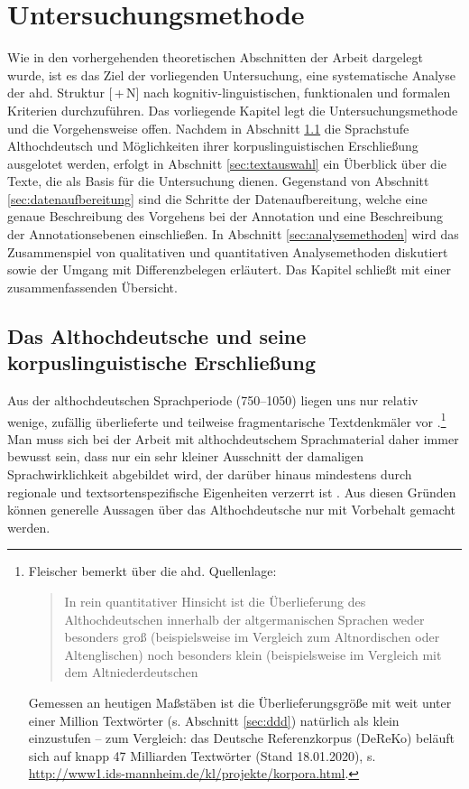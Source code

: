 \chapter{Untersuchungsmethode}\label{methode}

Wie in den vorhergehenden theoretischen Abschnitten der Arbeit dargelegt wurde, ist es das Ziel der vorliegenden Untersuchung, eine systematische Analyse der ahd. Struktur [\,+\,N] nach  kognitiv-linguistischen, funktionalen und formalen Kriterien durchzuführen. Das vorliegende Kapitel legt die Untersuchungsmethode und die Vorgehensweise offen. Nachdem in Abschnitt \ref{sec:ahd} die Sprachstufe Althochdeutsch und Möglichkeiten ihrer korpuslinguistischen Erschließung ausgelotet werden, erfolgt in Abschnitt \ref{sec:textauswahl} ein Überblick über die Texte, die als Basis für die Untersuchung dienen. Gegenstand von Abschnitt \ref{sec:datenaufbereitung} sind die Schritte der Datenaufbereitung, welche eine genaue Beschreibung des Vorgehens bei der Annotation und eine Beschreibung der Annotationsebenen einschließen. In Abschnitt \ref{sec:analysemethoden} wird das Zusammenspiel von qualitativen und quantitativen Analysemethoden diskutiert sowie der Umgang mit Differenzbelegen erläutert. Das Kapitel schließt mit einer zusammenfassenden Übersicht. 

\section{Das Althochdeutsche und seine korpuslinguistische Erschließung}\label{sec:ahd}

Aus der althochdeutschen Sprachperiode (750--1050) liegen uns nur relativ wenige, zufällig überlieferte und teilweise fragmentarische Textdenkmäler vor \parencite[zur Überlieferungsproblematik s. ausführlich][49--105]{Sonderegger2003}.\footnote{Fleischer bemerkt über die ahd. Quellenlage: \blockcquote[27]{Fleischer2006}{In rein quantitativer Hinsicht ist die Überlieferung des Althochdeutschen innerhalb der altgermanischen Sprachen weder besonders groß (beispielsweise im Vergleich zum Altnordischen oder Altenglischen) noch besonders  klein (beispielsweise im Vergleich mit dem Altniederdeutschen}. Gemessen an heutigen Maßstäben ist die Überlieferungsgröße mit weit unter einer Million Textwörter (s. Abschnitt \ref{sec:ddd}) natürlich als klein einzustufen -- zum Vergleich: das Deutsche Referenzkorpus (DeReKo) beläuft sich auf knapp 47 Milliarden Textwörter (Stand 18.01.2020), s. \url{http://www1.ids-mannheim.de/kl/projekte/korpora.html}.} Man muss sich bei der Arbeit mit althochdeutschem Sprachmaterial daher immer bewusst sein, dass  nur ein sehr kleiner Ausschnitt der damaligen Sprachwirklichkeit abgebildet wird, der darüber hinaus mindestens durch regionale und textsortenspezifische Eigenheiten verzerrt ist  \parencite[27--31]{Fleischer2006}. Aus diesen Gründen können generelle Aussagen über das Althochdeutsche nur mit Vorbehalt gemacht werden. 

